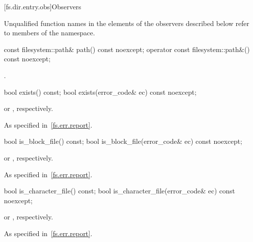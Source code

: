 [fs.dir.entry.obs]{Observers}

\pnum
Unqualified function names in the \returns elements of the
 observers described below refer to members of the
 namespace.

%
%
\begin{itemdecl}
const filesystem::path& path() const noexcept;
operator const filesystem::path&() const noexcept;
\end{itemdecl}

\begin{itemdescr}
\pnum
\returns
{}.
\end{itemdescr}

%
\begin{itemdecl}
bool exists() const;
bool exists(error_code& ec) const noexcept;
\end{itemdecl}

\begin{itemdescr}
\pnum
\returns
{} or , respectively.

\pnum
\throws
As specified in~\ref{fs.err.report}.
\end{itemdescr}

%
\begin{itemdecl}
bool is_block_file() const;
bool is_block_file(error_code& ec) const noexcept;
\end{itemdecl}

\begin{itemdescr}
\pnum
\returns
{} or , respectively.

\pnum
\throws
As specified in~\ref{fs.err.report}.
\end{itemdescr}

%
\begin{itemdecl}
bool is_character_file() const;
bool is_character_file(error_code& ec) const noexcept;
\end{itemdecl}

\begin{itemdescr}
\pnum
\returns
{} or , respectively.

\pnum
\throws
As specified in~\ref{fs.err.report}.
\end{itemdescr}

